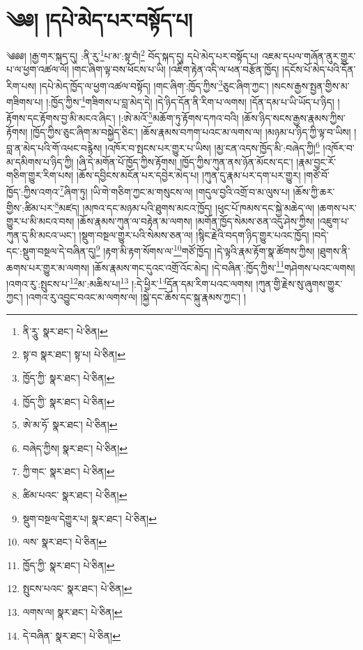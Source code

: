 \setcounter{footnote}{0} 
\chapter{༄༅། །དཔེ་མེད་པར་བསྟོད་པ།}༄༅༅། །རྒྱ་གར་སྐད་དུ། :ནི་རུ་\footnote{ནི་རཱུ་  སྣར་ཐང་།  པེ་ཅིན། }པ་མ་:སྟ་བཾ།\footnote{སྟ་བ  སྣར་ཐང་། སྟ་པ།  པེ་ཅིན། } བོད་སྐད་དུ། དཔེ་མེད་པར་བསྟོད་པ། འཇམ་དཔལ་གཞོན་ནུར་གྱུར་པ་ལ་ཕྱག་འཚལ་ལོ། །གང་ཞིག་ལྟ་བས་ཕོངས་པ་ཡི། །འཇིག་རྟེན་འདི་ལ་ཕན་བརྩོན་ཁྱོད། །དངོས་པོ་མེད་པའི་དོན་རིག་པས། །དཔེ་མེད་ཁྱོད་ལ་ཕྱག་འཚལ་བསྟོད། །གང་ཞིག་:ཁྱོད་ཀྱིས་\footnote{ཁྱོད་ཀྱི་  སྣར་ཐང་།  པེ་ཅིན། }ཅུང་ཞིག་ཀྱང་། །སངས་རྒྱས་སྤྱན་གྱིས་མ་གཟིགས་པ། །:ཁྱོད་ཀྱིས་\footnote{ཁྱོད་ཀྱི་  སྣར་ཐང་།  པེ་ཅིན། }གཟིགས་པ་བླ་མེད་དེ། །དེ་ཉིད་དོན་ནི་རིག་པ་ལགས། །དོན་དམ་པ་ཡི་ཡོད་པ་ཉིད། །རྟོགས་དང་རྟོགས་བྱ་མི་མངའ་ཞིང་། །:ཨེ་མའོ་\footnote{ཨེ་མ་ཧོ་  སྣར་ཐང་།  པེ་ཅིན། }མཆོག་ཏུ་རྟོགས་དཀའ་བའི། །ཆོས་ཉིད་སངས་རྒྱས་རྣམས་ཀྱིས་རྟོགས། །ཁྱོད་ཀྱིས་ཅུང་ཞིག་མ་བསྐྱེད་ཅིང་། །ཆོས་རྣམས་བཀག་པའང་མ་ལགས་ལ། །མཉམ་པ་ཉིད་ཀྱི་ལྟ་བ་ཡིས། །བླ་ན་མེད་པའི་གོ་འཕང་བརྙེས། །འཁོར་བ་སྤངས་པར་གྱུར་པ་ཡིས། །མྱ་ངན་འདས་ཁྱོད་མི་:བཞེད་ཀྱི།\footnote{བཞེད་ཀྱིས།  སྣར་ཐང་།  པེ་ཅིན། } །འཁོར་བ་མ་དམིགས་པ་ཉིད་ཀྱི། །ཞི་དེ་མགོན་པོ་ཁྱོད་ཀྱིས་རྟོགས། །ཁྱོད་ཀྱིས་ཀུན་ནས་ཉོན་མོངས་དང་། །རྣམ་བྱང་རོ་གཅིག་གྱུར་རིག་པས། །ཆོས་དབྱིངས་མངོན་པར་དབྱེར་མེད་པ། །ཀུན་དུ་རྣམ་པར་དག་པར་གྱུར། །གཙོ་བོ་ཁྱོད་:ཀྱིས་འགའ་\footnote{ཀྱི་གང་  སྣར་ཐང་།  པེ་ཅིན། }ཞིག་ཏུ། །ཡི་གེ་གཅིག་ཀྱང་མ་གསུངས་ལ། །གདུལ་བྱའི་འགྲོ་བ་མ་ལུས་པ། །ཆོས་ཀྱི་ཆར་གྱིས་:ཚིམ་པར་\footnote{ཚིམ་པའང་  སྣར་ཐང་།  པེ་ཅིན། }མཛད། །མཁའ་དང་མཉམ་པའི་ཐུགས་མངའ་ཁྱོད། །ཕུང་པོ་ཁམས་དང་སྐྱེ་མཆེད་ལ། །ཆགས་པར་གྱུར་པ་མི་མངའ་བས། །ཆོས་རྣམས་ཀུན་ལ་བརྟེན་མ་ལགས། །མགོན་ཁྱོད་སེམས་ཅན་འདུ་ཤེས་ཀྱིས། །འཇུག་པ་ཀུན་དུ་མི་མངའ་ཡང་། །སྡུག་བསྔལ་གྱུར་པའི་སེམས་ཅན་ལ། །སྙིང་རྗེའི་བདག་ཉིད་གྱུར་པའང་ཁྱོད། །བདེ་དང་:སྡུག་བསྔལ་དེ་བཞིན་དུ།\footnote{སྡུག་བསྔལ་དེགྱུར་པ།  སྣར་ཐང་།  པེ་ཅིན། } །རྟག་མི་རྟག་སོགས་ལ་\footnote{ལས་  སྣར་ཐང་།  པེ་ཅིན། }གཙོ་ཁྱོད། །དེ་ལྟའི་རྣམ་རྟོག་སྣ་ཚོགས་ཀྱིས། །ཐུགས་ནི་ཆགས་པར་གྱུར་མ་ལགས། །ཆོས་རྣམས་གང་དུའང་འགྲོ་འོང་མེད། །དེ་བཞིན་:ཁྱོད་ཀྱིས་\footnote{ཁྱོད་ཀྱི་  སྣར་ཐང་།  པེ་ཅིན། }གཤེགས་པའང་ལགས། །འགའ་རུ་:སྤུངས་པ་\footnote{སྤུངས་པའང་  སྣར་ཐང་།  པེ་ཅིན། }མ་:མཆིས་པ།\footnote{ལགས་ལ།  སྣར་ཐང་།  པེ་ཅིན། } །:དེ་ཕྱིར་\footnote{དེ་བཞིན་  སྣར་ཐང་།  པེ་ཅིན། }དོན་དམ་རིག་པའང་ལགས། །ཀུན་གྱི་རྗེས་སུ་ཞུགས་གྱུར་ཀྱང་། །འགའ་རུ་འབྱུང་བའང་མ་ལགས་ལ། །སྐྱེ་དང་ཆོས་དང་སྐུ་རྣམས་ཀྱང་། །
